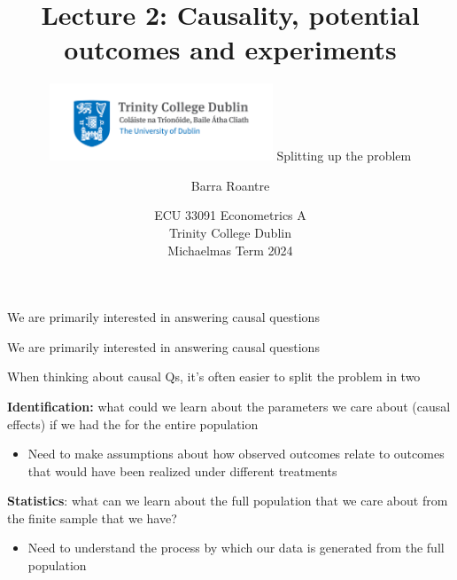 \documentclass[11pt,english]{beamer}
\subtitle{
    \includegraphics[width=0.50\textwidth]{TCDlogo.jpg}
}
\newenvironment{wideitemize}{\itemize\addtolength{\itemsep}{10pt}}{\enditemize}
\begin{document}
\begin{frame}[noframenumbering]{}
\vspace{0.5cm}
\title[]{Lecture 2: Causality, potential outcomes and experiments}
\author{Barra Roantre}
\date{ECU 33091 Econometrics A \\ Trinity College Dublin \\ Michaelmas Term 2024} 
\titlepage {\small{}\ }\thispagestyle{empty} \vspace{-30pt}

\end{frame}
 

\begin{frame}{We are primarily interested in answering causal questions}



\end{frame}


\begin{frame}{We are primarily interested in answering causal questions}

\subtitle{Splitting up the problem}
	\begin{wideitemize}
		
		\item
		When thinking about causal Qs, it's often easier to split the problem in two
		
		\item
		\textbf{Identification:} what could we learn about the parameters we care about (causal effects) if we had the  for the entire population
		\begin{itemize}
			\item 
			Need to make assumptions about how observed outcomes relate to outcomes that would have been realized under different treatments
		\end{itemize}
		
		\item
		\textbf{Statistics}: what can we learn about the full population that we care about from the finite sample that we have?
			\begin{itemize}
				\item 
				Need to understand the process by which our data is generated from the full population
			\end{itemize} 	
		
	\end{wideitemize}	
	
\end{frame}
\end{document}
